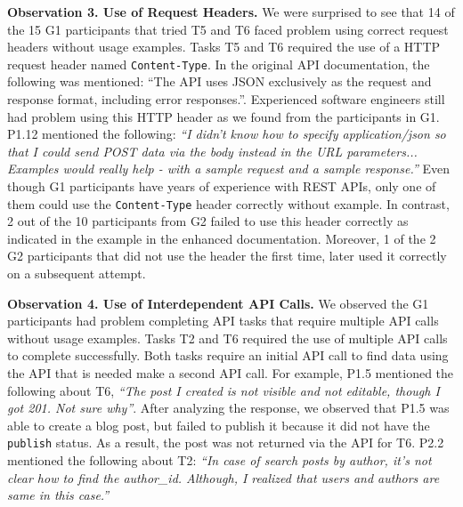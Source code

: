 \documentclass[conference]{IEEEtran}
\begin{document}
\vspace{1mm}
\hspace{-5mm}
\vspace{0.5mm}

\textbf{Observation 3. Use of Request Headers.} We were surprised to see that 14 of the 15 G1 participants that tried T5 and T6 faced problem using correct request headers without usage examples. Tasks T5 and T6 required the use of a HTTP request header named \lstinline{Content-Type}. In the original API documentation, the following was mentioned: ``The API uses JSON exclusively as the request and response format, including error responses.''. Experienced software engineers still had problem using this HTTP header as we found from the participants in G1. P1.12 mentioned the following: \textit{``I didn't know how to specify application/json so that I could send POST data via the body instead in the URL parameters... Examples would really help - with a sample request and a sample response.''}  Even though G1 participants have years of experience with REST APIs, only one of them could use the \lstinline{Content-Type} header correctly without example. In contrast, 2 out of the 10 participants from G2 failed to use this header correctly as indicated in the example in the enhanced documentation. Moreover, 1 of the 2 G2 participants that did not use the header the first time, later used it correctly on a subsequent attempt.

\vspace{1mm}
\hspace{-5mm}
\vspace{0.5mm}

\textbf{Observation 4. Use of Interdependent API Calls.} We observed the G1 participants had problem completing API tasks that require multiple API calls without usage examples. Tasks T2 and T6 required the use of multiple API calls to complete successfully. Both tasks require an initial API call to find data using the API that is needed make a second API call. For example, P1.5 mentioned the following about T6, \textit{``The post I created is not visible and not editable, though I got 201. Not sure why''}. After analyzing the response, we observed that P1.5 was able to create a blog post, but failed to publish it because it did not have the \lstinline{publish} status. As a result, the post was not returned via the API for T6. P2.2 mentioned the following about T2: \textit{``In case of search posts by author, it's not clear how to find the author\_id. Although, I realized that users and authors are same in this case.''}
\end{document}
